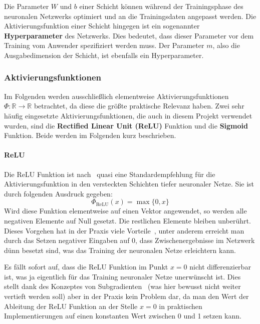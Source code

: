 Die Parameter $W$ und $b$ einer Schicht k\"onnen w\"ahrend der Trainingsphase
des neuronalen Netzwerks optimiert und an die Trainingsdaten
angepasst werden.
Die Aktivierungsfunktion einer Schicht hingegen ist ein sogenannter
\textbf{Hyperparameter} des Netzwerks. Dies bedeutet, dass dieser
Parameter vor dem Training vom Anwender spezifiziert werden muss.
Der Parameter $m$, also die Ausgabedimension der Schicht, ist ebenfalls
ein Hyperparameter.

\subsubsection{Aktivierungsfunktionen}

Im Folgenden werden ausschlie{\ss}lich elementweise Aktivierungsfunktionen
$\Phi: \mathbb{R} \rightarrow \mathbb{R}$ betrachtet,
da diese die gr\"o{\ss}te praktische Relevanz haben.
Zwei sehr h\"aufig eingesetzte Aktivierungsfunktionen, die auch in diesem
Projekt verwendet wurden, sind die \textbf{Rectified Linear Unit (ReLU)}
Funktion und die \textbf{Sigmoid} Funktion.
Beide werden im Folgenden kurz beschrieben.

\paragraph{ReLU}

Die ReLU Funktion ist nach~\cite{glorot} quasi eine
Standardempfehlung f\"ur die Aktivierungsfunktion in den
versteckten Schichten tiefer neuronaler Netze.
Sie ist durch folgenden Ausdruck gegeben:
\begin{equation*}
    \Phi_\text{ReLU}(x) = \max \{ 0, x \}
\end{equation*}
Wird diese Funktion elementweise auf einen Vektor angewendet, so werden
alle negativen Elemente auf Null gesetzt. Die restlichen Elemente bleiben
unber\"uhrt.
Dieses Vorgehen hat in der Praxis viele Vorteile~\cite{glorot}, unter
anderem erreicht man durch das Setzen negativer Eingaben auf 0,
dass Zwischenergebnisse im Netzwerk d\"unn besetzt sind, was das Training
der neuronalen Netze erleichtern kann.

Es f\"allt sofort auf, dass die ReLU Funktion im Punkt $x=0$ nicht
differenzierbar ist, was ja eigentlich f\"ur das Training neuronaler
Netze unerw\"unscht ist.
Dies stellt dank des Konzeptes von Subgradienten~\cite{understanding_ml}
(was hier bewusst nicht weiter vertieft werden soll)
aber in der Praxis kein Problem dar, da man den Wert der Ableitung der ReLU Funktion
an der Stelle $x=0$ in praktischen Implementierungen auf einen konstanten
Wert zwischen 0 und 1 setzen kann.

